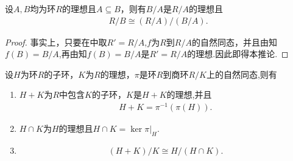 \documentclass[../../main.tex]{subfiles}%
\begin{document}
\begin{corollary}\label{corollary:抽象代数--推论1.7.2}
设$A,B$均为环$R$的理想且$A \subseteq B$，则有$B/A$是$R/A$的理想且
\begin{align*}
R/B \cong (R/A)/(B/A). 
\end{align*}
\end{corollary}
\begin{proof}
事实上，只要在中取$R' = R/A$,$f$为$R$到$R/A$的自然同态，并且由知$f(B)=B/A$,再由知$f(B)=B/A$是$R'=R/A$的理想.因此即得本推论.
\end{proof}

\begin{theorem}\label{theorem:抽象代数--定理1.7.6}
设$H$为环$R$的子环，$K$为$R$的理想，$\pi$是环$R$到商环$R/K$上的自然同态,则有
\begin{enumerate}[(1)]
\item\label{theorem:抽象代数--定理1.7.6-1} $H + K$为$R$中包含$K$的子环，$K$是$H+K$的理想,并且
\begin{align*}
H+K=\pi^{-1}(\pi(H)).
\end{align*}

\item\label{theorem:抽象代数--定理1.7.6-2} $H \cap K$为$H$的理想且$H\cap K=\ker \pi|_{H}.$

\item\label{theorem:抽象代数--定理1.7.6-3} \begin{align}
(H + K)/K \cong H/(H \cap K). \label{eq:1ger4wg34wgg54.7.g890u34349n8v4b9}
\end{align}
\end{enumerate}
\end{theorem}
\end{document}
